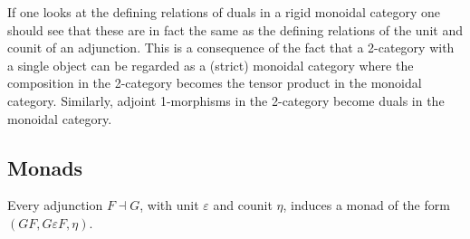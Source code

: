     \begin{remark}
        If one looks at the defining relations of duals in a rigid monoidal category one should see that these are in fact the same as the defining relations of the unit and counit of an adjunction. This is a consequence of the fact that a 2-category with a single object can be regarded as a (strict) monoidal category where the composition in the 2-category becomes the tensor product in the monoidal category. Similarly, adjoint 1-morphisms in the 2-category become duals in the monoidal category.
    \end{remark}

\subsection{Monads}

    \begin{example}[Adjunction]
        Every adjunction $F\dashv G$, with unit $\varepsilon$ and counit $\eta$, induces a monad of the form $(GF, G\varepsilon F, \eta)$.
    \end{example}

